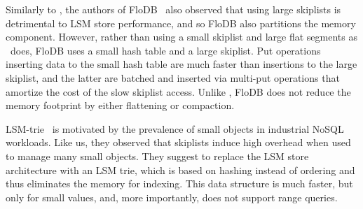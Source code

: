 Similarly to \sys, the authors of FloDB~\cite{flodb} also observed that using large skiplists is detrimental to 
LSM store performance, and so FloDB also partitions the memory component. However, rather than using 
a small skiplist and large flat segments as \sys\ does, FloDB  uses a small hash table and a large skiplist.
Put operations inserting data to the small hash table are much faster than insertions to the large skiplist, 
and the latter are batched and inserted via multi-put operations that amortize the cost of the slow skiplist access.
Unlike \sys, FloDB does not reduce the memory footprint by either flattening or compaction. 

LSM-trie~\cite{Wu2015} is motivated by the prevalence of small objects in industrial NoSQL workloads.  
Like us, they observed that skiplists induce high overhead when used to manage many small objects.  
They suggest to replace the LSM store architecture with an LSM trie, which is based on hashing instead of ordering 
and thus eliminates the memory for indexing. This data structure is much faster, but only for small values, and, more importantly, does not
support range queries.

